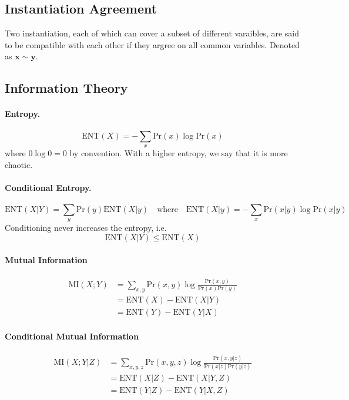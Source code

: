 \documentclass[11pt]{article}
\newcommand{\bx}{\mathbf{x}}
\newcommand{\by}{\mathbf{y}}
\newcommand{\pr}{\mathrm{Pr}}
\newcommand{\ent}{\mathrm{ENT}}
\newcommand{\mi}{\mathrm{MI}}
\begin{document}
\subsection{Instantiation Agreement}
Two instantiation, each of which can cover a subset of different varaibles, are said to be compatible with each other if they argree on all common variables. Denoted as $\bx \sim \by$.

\subsection{Information Theory}
\paragraph{Entropy.} 
\begin{equation}
\ent  (X) = - \sum_x \pr (x) \log \pr( x)
\end{equation}
where $0 \log 0 = 0 $ by convention. With a higher entropy, we say that it is more chaotic. 

\paragraph{Conditional Entropy. }
\begin{equation}
	\ent (X | Y ) = \sum_y \pr (y) \ent(X | y) \quad \text{where} \quad \ent (X|y) = - \sum_{x} \pr(x|y) \log \pr(x | y)
\end{equation}
Conditioning never increases the entropy, i.e. 
\begin{equation}
	\ent (X | Y) \leq \ent (X)
\end{equation}

\paragraph{Mutual Information} 
\begin{align}
	\mi(X; Y) 
	&= \sum_{x, y} \pr (x, y) \log \frac{\pr (x, y)}{\pr (x) \pr (y)} \\
	&= \ent (X) - \ent (X | Y) \\
	&= \ent (Y) - \ent ( Y | X) 
\end{align}

\paragraph{Conditional Mutual Information}
\begin{align}
	\mi ( X; Y | Z) 
	&= \sum_{x, y, z} \pr (x, y , z) \log \frac{\pr (x, y | z)}{\pr (x | z) \pr(y | z)} \\
	&= \ent (X | Z) - \ent (X | Y, Z) \\
	&= \ent (Y | Z) - \ent (Y | X, Z)
\end{align}
\end{document}

